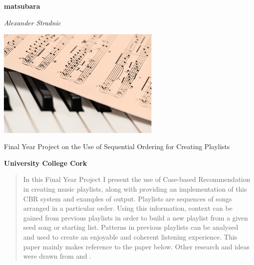 \documentclass[a4paper, 12pt]{report}
\begin{document}
\begin{titlepage}
    \begin{center}
        \vspace*{1cm}

        \huge
        \textbf{matsubara}

        \vspace{1cm}

        \textit{Alexander Stradnic}

        \vspace{3cm}

        \includegraphics[width=0.6\textwidth]{"piano.jpg"}

        \vfill

        \textsf{Final Year Project on the Use of Sequential Ordering for Creating Playlists}

        \vspace{1cm}

        \textbf{University College Cork}

        \vspace*{1cm}

    \end{center}
\end{titlepage}

\begin{abstract}
In this Final Year Project I present the use of Case-based Recommendation in creating music playlists, 
along with providing an implementation of this CBR system and examples of output.
Playlists are sequences of songs arranged in a particular order. Using this information, 
context can be gained from previous playlists in order to build a new playlist from a given seed song or starting list. 
Patterns in previous playlists can be analysed and used to create an enjoyable and coherent listening experience.
This paper mainly makes reference to the paper below\cite{main}. 
Other research and ideas were drawn from \cite{constructive-adaptation} and \cite{cbr-general}.
\end{abstract}
\end{document}
